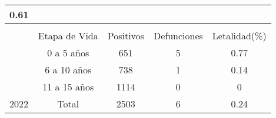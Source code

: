 \begin{tabular}{lcccc}
		\multicolumn{1}{c|}{\cellcolor[HTML]{ECF4FF}0.61} \\ \hline
		&
		\multicolumn{1}{l}{} &
		\multicolumn{1}{l}{} &
		\multicolumn{1}{l}{} &
		\multicolumn{1}{l}{} \\ \cline{2-5} 
		\multicolumn{1}{l|}{} &
		\multicolumn{1}{c|}{\cellcolor[HTML]{ECF4FF}Etapa de Vida} &
		\multicolumn{1}{c|}{\cellcolor[HTML]{ECF4FF}Positivos} &
		\multicolumn{1}{c|}{\cellcolor[HTML]{ECF4FF}Defunciones} &
		\multicolumn{1}{c|}{\cellcolor[HTML]{ECF4FF}Letalidad(\%)} \\ \hline
		\multicolumn{1}{|l|}{} &
		\multicolumn{1}{c|}{0 a 5 años} &
		\multicolumn{1}{c|}{651} &
		\multicolumn{1}{c|}{5} &
		\multicolumn{1}{c|}{0.77} \\ \cline{2-5} 
		\multicolumn{1}{|l|}{} &
		\multicolumn{1}{c|}{6 a 10 años} &
		\multicolumn{1}{c|}{738} &
		\multicolumn{1}{c|}{1} &
		\multicolumn{1}{c|}{0.14} \\ \cline{2-5} 
		\multicolumn{1}{|l|}{} &
		\multicolumn{1}{c|}{11 a 15 años} &
		\multicolumn{1}{c|}{1114} &
		\multicolumn{1}{c|}{0} &
		\multicolumn{1}{c|}{0} \\ \cline{2-5} 
		\multicolumn{1}{|l|}{\multirow{-4}{*}{2022}} &
		\multicolumn{1}{c|}{\cellcolor[HTML]{ECF4FF}Total} &
		\multicolumn{1}{c|}{\cellcolor[HTML]{ECF4FF}2503} &
		\multicolumn{1}{c|}{\cellcolor[HTML]{ECF4FF}6} &
		\multicolumn{1}{c|}{\cellcolor[HTML]{ECF4FF}0.24} \\ \hline
	\end{tabular}